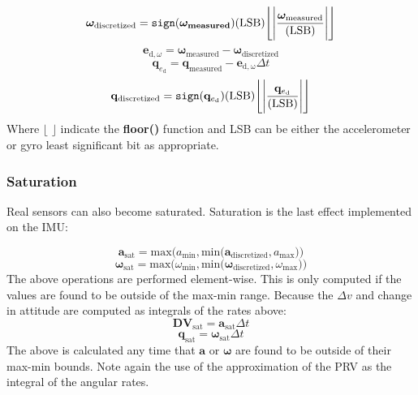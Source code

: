 \begin{equation}
\bm{\omega}_{\mathrm{discretized}} = \verb|sign|(\bm{\bm{\omega}_\mathrm{measured}})(\mathrm{LSB})\Biggl\lfloor\Biggl|\frac{\bm{\omega}_{\mathrm{measured}}}{(\mathrm{LSB})}\Biggr|\Biggr\rfloor
\end{equation}
\begin{equation}
\mathbf{e}_{\mathrm{d},\omega} =\bm{\omega}_{\mathrm{measured}} - \bm{\omega}_{\mathrm{discretized}}
\end{equation}
\begin{equation}
\mathbf{q}_{e_{\mathrm{d}}} = \mathbf{q}_{\mathrm{measured}} - \mathbf{e}_{\mathrm{d},\mathrm{\omega}}\Delta t
\end{equation}
\begin{equation}
\mathbf{q}_{\mathrm{discretized}} = \verb|sign|(\mathbf{q}_{e_{\mathrm{d}}}) (\mathrm{LSB}) \Biggl\lfloor\Biggl|\frac{\mathbf{q}_{e_{\mathrm{d}}}}{(\mathrm{LSB})}\Biggr|\Biggr\rfloor
\end{equation}
Where $\lfloor$  $\rfloor$ indicate the \textbf{floor()} function and LSB can be either the accelerometer or gyro least significant bit as appropriate.

\subsubsection{Saturation}
Real sensors can also become saturated. Saturation is the last effect implemented on the IMU:

\begin{equation}
	\bm{a}_{\mathrm{sat}} = \mathrm{max}\big(a_{\mathrm{min}}, \mathrm{min}\big(    \bm{a}_{\mathrm{discretized}}, a_{\mathrm{max}}    \big)   \big)
\end{equation}
\begin{equation}
\bm{\omega}_{\mathrm{sat}} = \mathrm{max}\big(\omega_{\mathrm{min}}, \mathrm{min}\big(    \bm{\omega}_{\mathrm{discretized}}, \omega_{\mathrm{max}}    \big)   \big)
\end{equation}
The above operations are performed element-wise. This is only computed if the values are found to be outside of the max-min range.
Because the $\Delta v$ and change in attitude are computed as integrals of the rates above:
\begin{equation}
\bm{DV}_{\mathrm{sat}} = \bm{a}_{\mathrm{sat}}  \Delta t
\end{equation}
\begin{equation}
\bm{q}_{\mathrm{sat}} = \bm{\omega}_{\mathrm{sat}}  \Delta t
\end{equation}
The above is calculated any time that $\bm{a}$ or $\bm{\omega}$ are found to be outside of their max-min bounds. Note again the use of the approximation of the PRV as the integral of the angular rates.
